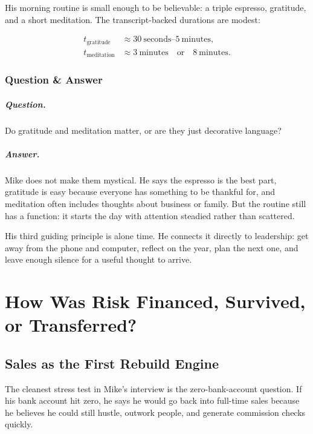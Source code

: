 \documentclass[11pt,oneside]{book}
\begin{document}
His morning routine is small enough to be believable: a triple espresso, gratitude, and a short meditation. The transcript-backed durations are modest:

\begin{align}
t_{\mathrm{gratitude}} &\approx 30\ \mathrm{seconds}\text{--}5\ \mathrm{minutes},\\
t_{\mathrm{meditation}} &\approx 3\ \mathrm{minutes}\quad \mathrm{or}\quad 8\ \mathrm{minutes}.
\end{align}

\subsection{Question \& Answer}

\paragraph{Question.}
Do gratitude and meditation matter, or are they just decorative language?

\paragraph{Answer.}
Mike does not make them mystical. He says the espresso is the best part, gratitude is easy because everyone has something to be thankful for, and meditation often includes thoughts about business or family. But the routine still has a function: it starts the day with attention steadied rather than scattered.

His third guiding principle is alone time. He connects it directly to leadership: get away from the phone and computer, reflect on the year, plan the next one, and leave enough silence for a useful thought to arrive.

\chapter{How Was Risk Financed, Survived, or Transferred?}

\section{Sales as the First Rebuild Engine}

The cleanest stress test in Mike's interview is the zero-bank-account question. If his bank account hit zero, he says he would go back into full-time sales because he believes he could still hustle, outwork people, and generate commission checks quickly.
\end{document}
